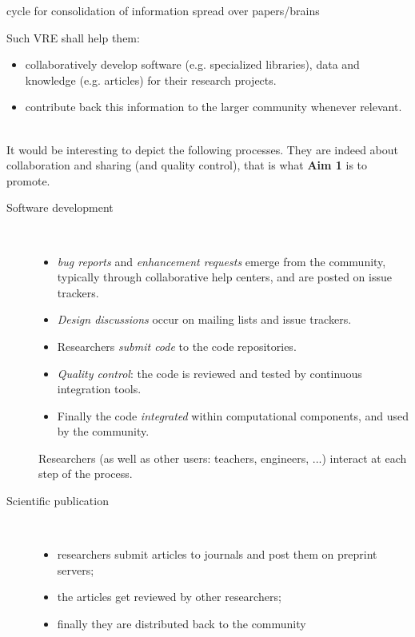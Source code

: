 {\begin{description}
\begin{itemize}
\begin{itemize}
        cycle for consolidation of information spread over
        papers/brains
      \end{itemize}
      Such VRE shall help them:
      \begin{itemize}
      \item collaboratively develop software (e.g. specialized
        libraries), data and knowledge (e.g. articles) for their
        research projects.
      \item contribute back this information to the larger community
        whenever relevant.
      \end{itemize}
    \end{itemize}
  \item[Processes:]\ \\
    It would be interesting to depict the following processes. They
    are indeed about collaboration and sharing (and quality control),
    that is what \textbf{Aim 1} is to promote.
    \begin{description}
    \item[Software development]\ 
      \begin{itemize}
      \item \emph{bug reports} and \emph{enhancement requests} emerge
        from the community, typically through collaborative help
        centers, and are posted on issue trackers.
      \item \emph{Design discussions} occur on mailing lists and issue
        trackers.
      \item Researchers \emph{submit code} to the code repositories.
      \item \emph{Quality control}: the code is reviewed and
        tested by continuous integration tools.
      \item Finally the code \emph{integrated} within computational
        components, and used by the community.
      \end{itemize}
      Researchers (as well as other users: teachers, engineers, ...)
      interact at each step of the process.
    \item[Scientific publication]\ 
      \begin{itemize}
      \item researchers submit articles to journals and post them on
        preprint servers;
      \item the articles get reviewed by other researchers;
      \item finally they are distributed back to the community
      \end{itemize}

\end{description}
\end{description}}
